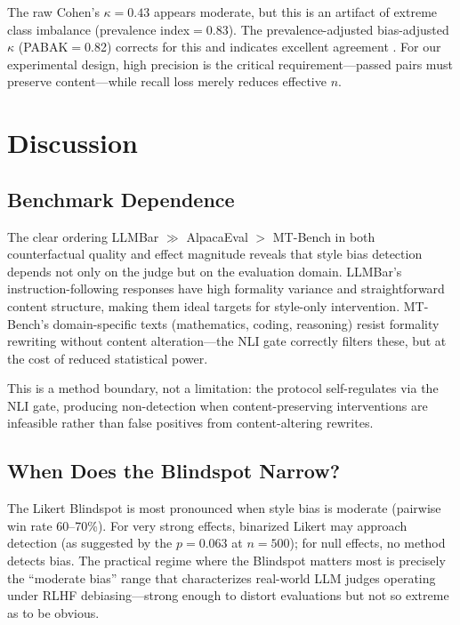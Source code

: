 \documentclass[11pt,a4paper]{article}
\begin{document}
The raw Cohen's $\kappa{=}0.43$ appears moderate, but this is an artifact of extreme class imbalance (prevalence index$=$0.83).
The prevalence-adjusted bias-adjusted $\kappa$ (PABAK$=$0.82) corrects for this and indicates excellent agreement \cite{feinstein1990}.
For our experimental design, high precision is the critical requirement---passed pairs must preserve content---while recall loss merely reduces effective $n$.

\section{Discussion}
\label{sec:discussion}

\subsection{Benchmark Dependence}
\label{sec:discuss_benchmark}

The clear ordering LLMBar $\gg$ AlpacaEval $>$ MT-Bench in both counterfactual quality and effect magnitude reveals that style bias detection depends not only on the judge but on the evaluation domain.
LLMBar's instruction-following responses have high formality variance and straightforward content structure, making them ideal targets for style-only intervention.
MT-Bench's domain-specific texts (mathematics, coding, reasoning) resist formality rewriting without content alteration---the NLI gate correctly filters these, but at the cost of reduced statistical power.

This is a method boundary, not a limitation: the protocol self-regulates via the NLI gate, producing non-detection when content-preserving interventions are infeasible rather than false positives from content-altering rewrites.

\subsection{When Does the Blindspot Narrow?}
\label{sec:discuss_blindspot}

The Likert Blindspot is most pronounced when style bias is moderate (pairwise win rate 60--70\%).
For very strong effects, binarized Likert may approach detection (as suggested by the $p{=}0.063$ at $n{=}500$); for null effects, no method detects bias.
The practical regime where the Blindspot matters most is precisely the ``moderate bias'' range that characterizes real-world LLM judges operating under RLHF debiasing---strong enough to distort evaluations but not so extreme as to be obvious.
\end{document}
